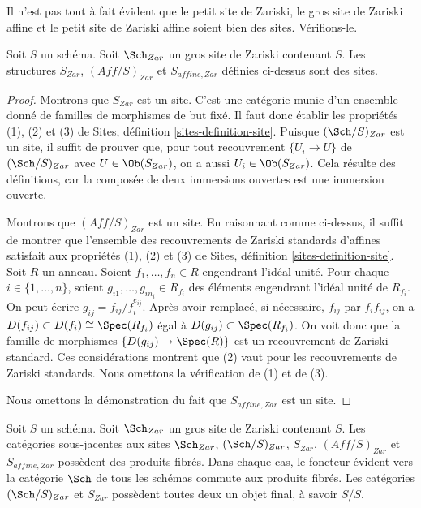 \noindent
Il n'est pas tout à fait évident que le petit site de Zariski,
le gros site de Zariski affine et le petit site de Zariski affine
soient bien des sites. Vérifions-le.

\begin{lemma}
\label{lemma-verify-site-Zariski}
Soit $S$ un schéma. Soit $\Sch_{Zar}$ un gros site de Zariski
contenant $S$. Les structures $S_{Zar}$, $(\textit{Aff}/S)_{Zar}$
et $S_{affine, Zar}$ définies ci-dessus sont des sites.
\end{lemma}

\begin{proof}
Montrons que $S_{Zar}$ est un site. C'est une catégorie munie d'un
ensemble donné de familles de morphismes de but fixé. Il faut donc
établir les propriétés (1), (2) et (3) de
Sites, définition \ref{sites-definition-site}.
Puisque $(\Sch/S)_{Zar}$ est un site, il suffit de prouver
que, pour tout recouvrement $\{U_i \to U\}$ de $(\Sch/S)_{Zar}$
avec $U \in \Ob(S_{Zar})$, on a aussi $U_i \in \Ob(S_{Zar})$.
Cela résulte des définitions,
car la composée de deux immersions ouvertes est une immersion ouverte.

\medskip\noindent
Montrons que $(\textit{Aff}/S)_{Zar}$ est un site.
En raisonnant comme ci-dessus, il suffit de montrer que l'ensemble
des recouvrements de Zariski standards d'affines satisfait aux propriétés
(1), (2) et (3) de
Sites, définition \ref{sites-definition-site}.
Soit $R$ un anneau. Soient $f_1, \ldots, f_n \in R$ engendrant l'idéal unité.
Pour chaque $i \in \{1, \ldots, n\}$, soient $g_{i1}, \ldots, g_{in_i} \in R_{f_i}$
des éléments engendrant l'idéal unité de $R_{f_i}$. On peut écrire
$g_{ij} = f_{ij}/f_i^{e_{ij}}$. Après avoir remplacé, si nécessaire,
$f_{ij}$ par $f_i f_{ij}$, on a
$D(f_{ij}) \subset D(f_i) \cong \Spec(R_{f_i})$
égal à $D(g_{ij}) \subset \Spec(R_{f_i})$. On voit donc que
la famille de morphismes $\{D(g_{ij}) \to \Spec(R)\}$
est un recouvrement de Zariski standard. Ces considérations
montrent que (2) vaut pour les recouvrements de Zariski standards.
Nous omettons la vérification de (1) et de (3).

\medskip\noindent
Nous omettons la démonstration du fait que $S_{affine, Zar}$ est un site.
\end{proof}

\begin{lemma}
\label{lemma-fibre-products-Zariski}
Soit $S$ un schéma. Soit $\Sch_{Zar}$ un gros site de Zariski
contenant $S$. Les catégories sous-jacentes aux sites
$\Sch_{Zar}$, $(\Sch/S)_{Zar}$,
$S_{Zar}$, $(\textit{Aff}/S)_{Zar}$ et $S_{affine, Zar}$ possèdent des produits fibrés.
Dans chaque cas, le foncteur évident vers la catégorie $\Sch$ de
tous les schémas commute aux produits fibrés. Les catégories
$(\Sch/S)_{Zar}$ et $S_{Zar}$ possèdent toutes deux un objet final,
à savoir $S/S$.
\end{lemma}

